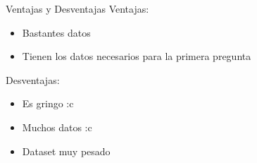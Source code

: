 \begin{frame}{Ventajas y Desventajas}
    Ventajas:
    \begin{itemize}
        \item[\ding{51}] Bastantes datos
        \item[\ding{51}] Tienen los datos necesarios para la primera pregunta
    \end{itemize}
    
    Desventajas:
    \begin{itemize}
        \item[\ding{55}] Es gringo :c
        \item[\ding{55}] Muchos datos :c
        \item[\ding{55}] Dataset muy pesado
    \end{itemize}
\end{frame}
